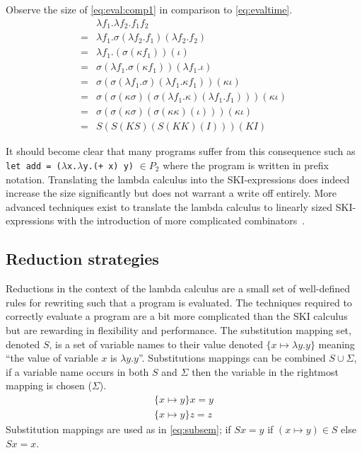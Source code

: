 \documentclass[11pt,oneside,a4paper]{report}
\begin{document}
\begin{exmp}
    Observe the size of \autoref{eq:eval:comp1} in comparison to \autoref{eq:evaltime}.
\begin{align}
    &\lambda f_1 . \lambda f_2 . f_1 f_2 \label{eq:eval:comp1}\\
    =&\lambda f_1 . \sigma(\lambda f_2 . f_1)(\lambda f_2 . f_2) \tag*{} \\
    =&\lambda f_1 . (\sigma(\kappa f_1))(\iota) \tag*{} \\
    =&\sigma (\lambda f_1 . \sigma (\kappa f_1)) (\lambda f_1 . \iota) \tag*{} \\
    =&\sigma (\sigma (\lambda f_1 . \sigma) (\lambda f_1 . \kappa f_1)) (\kappa \iota) \tag*{} \\
    =&\sigma (\sigma (\kappa \sigma) (\sigma (\lambda f_1 . \kappa) (\lambda f_1 . f_1))) (\kappa \iota) \tag*{} \\
    =&\sigma (\sigma (\kappa \sigma) (\sigma (\kappa \kappa) (\iota))) (\kappa \iota) \tag*{} \\
    =&S (S (K S) (S (K K) (I))) (K I) \tag*{}
\end{align}
\end{exmp}
It should become clear that many programs suffer from this consequence such as \texttt{let add = ($\lambda$x.$\lambda$y.(+ x) y)} $\in P_2$ where the program is written in prefix notation.
Translating the lambda calculus into the SKI-expressions does indeed increase the size significantly but does not warrant a write off entirely.
More advanced techniques exist to translate the lambda calculus to linearly sized SKI-expressions with the introduction of more complicated combinators~\cite{kiselyov2018lambda}.

\subsection{Reduction strategies}
Reductions in the context of the lambda calculus are a small set of well-defined rules for rewriting such that a program is evaluated.
The techniques required to correctly evaluate a program are a bit more complicated than the SKI calculus but are rewarding in flexibility and performance.
The substitution mapping set, denoted $S$, is a set of variable names to their value denoted $\{ x \mapsto \lambda y . y \}$ meaning ``the value of variable $x$ is $\lambda y . y$''.
Substitutions mappings can be combined $S \cup \Sigma$, if a variable name occurs in both $S$ and $\Sigma$ then the variable in the rightmost mapping is chosen ($\Sigma$).
\begin{align}
  \{ x \mapsto y \} x = y\label{eq:subsem}\\
  \{ x \mapsto y \} z = z \tag*{}
\end{align}
Substitution mappings are used as in \autoref{eq:subsem}; if $Sx = y$ if $(x \mapsto y) \in S$ else $Sx = x$.
\end{document}
